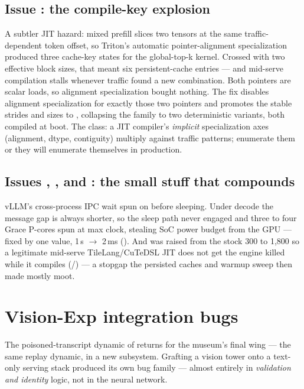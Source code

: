 \subsection{Issue : the compile-key explosion}

A subtler JIT hazard: mixed prefill slices two tensors at the same
traffic-dependent token offset, so Triton's automatic pointer-alignment
specialization produced three cache-key states for the global-top-k kernel.
Crossed with two effective block sizes, that meant six persistent-cache
entries --- and mid-serve compilation stalls whenever traffic found a new
combination. Both
pointers are scalar loads, so alignment specialization bought nothing. The fix
disables alignment specialization for exactly those two pointers and promotes
the stable strides and sizes to , collapsing the family to
two deterministic variants, both compiled at boot. The class: a JIT compiler's
\emph{implicit} specialization axes (alignment, dtype, contiguity) multiply
against traffic patterns; enumerate them or they will enumerate themselves in
production.

\subsection{Issues , , and : the small stuff that compounds}

vLLM's cross-process IPC wait spun on  before sleeping.
Under decode the message gap is always shorter, so the sleep path never
engaged and three to four Grace P-cores spun at max clock, stealing SoC power
budget from the GPU --- fixed by one value, 1\,s $\rightarrow$ 2\,ms
(). And  was raised
from the stock 300 to 1{,}800 so a legitimate mid-serve TileLang/CuTeDSL JIT
does not get the engine killed while it compiles (/)
--- a stopgap the persisted caches and warmup sweep then made mostly moot.

\section{Vision-Exp integration bugs}
\label{sec:bugs-vision}

The poisoned-transcript dynamic of  returns for the
museum's final wing --- the same replay dynamic, in a new subsystem.
Grafting a vision tower onto a text-only serving stack produced its own bug
family --- almost entirely in \emph{validation and identity} logic, not in the
neural network.

